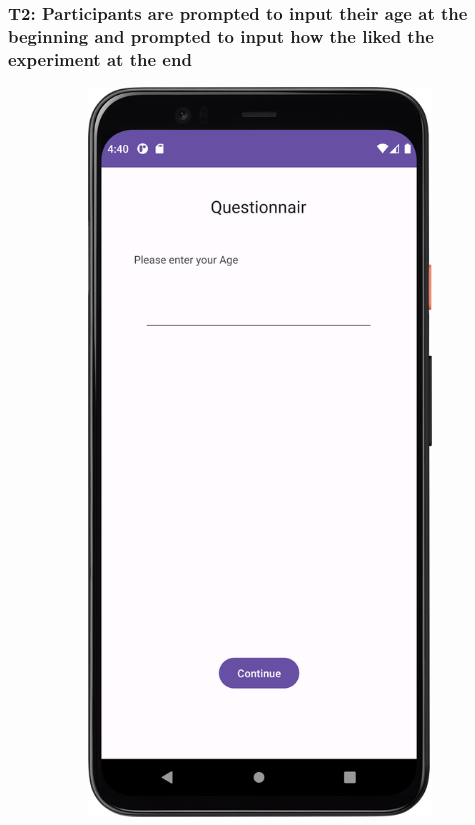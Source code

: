\subsubsection*{T2: Participants are prompted to input their age at the beginning and prompted to input how the liked the experiment at the end}


\begin{figure}[htbp]
    \centering
    \begin{subfigure}[b]{0.3\textwidth}
        \centering
        \includegraphics[width=\textwidth]{content/07_evaluation_of_the_solution/Screenshot_T2a.png}

\end{subfigure}
\end{figure}

